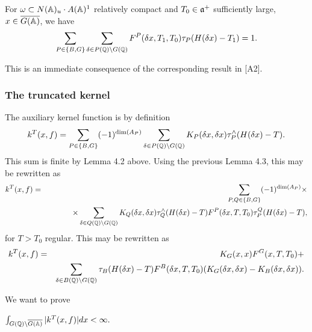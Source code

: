 \begin{lemma}
For $\omega \subset N({\Bbb{A}})_u\cdot A({\Bbb{A}})^1$ relatively
compact and
$T_0\in {\frak{a}}^{+}$ sufficiently large,
$x\in \overline{G({\Bbb{A}})}$, we
have 
\[
\sum_{P\in \{B,G\}}
\sum_{\delta \in P({\Bbb{Q}})\backslash G({\Bbb{Q}})}
F^P(\delta x,T_1,T_0)\tau _P(H(\delta x)-T_1)=1.
\]
\end{lemma}

This is an immediate consequence of the corresponding result in [A2].

\subsubsection{The truncated kernel}

The auxiliary kernel function is by definition 
\[
k^T(x,f)=\sum_{P\in \{B,G\}}(-1)^{\dim (A_P)}
\sum_{\delta \in P({\Bbb{Q}})\backslash G({\Bbb{Q}})}
K_P(\delta x,\delta x)\tau _P^{\wedge }(H(\delta x)-T). 
\]
This sum is finite by Lemma 4.2 above. Using the previous Lemma 4.3,
this may be rewritten as 
\begin{eqnarray*}
k^T(x,f) &=&\sum_{P,Q\in \{B,G\}}(-1)^{\dim (A_P)}\times \\
&&\;\;\;\;\;\;\;\;\;\;\;\times
\sum_{\delta \in Q({\Bbb{Q}})\backslash G({\Bbb{Q}})}
K_Q(\delta x,\delta x)\tau _Q^{\wedge }(H(\delta x)-T)
F^P(\delta x,T,T_0)\tau _P^Q(H(\delta x)-T),
\end{eqnarray*}
for $T>T_0$ regular. This may be rewritten as
\begin{eqnarray}
k^T(x,f) &=&K_G(x,x)F^G(x,T,T_0)+ \\
&&\sum_{\delta \in B({\Bbb{Q}})\backslash G({\Bbb{Q}})}
\tau _B(H(\delta x)-T)
F^B(\delta x,T,T_0)(K_G(\delta x,\delta x)-K_B(\delta x,\delta x)). 
\nonumber
\end{eqnarray}

We want to prove

\begin{lemma}
$\int_{G({\Bbb{Q}})\backslash \overline{G({\Bbb{A}})}}|k^T(x,f)|dx<\infty .$
\end{lemma}

